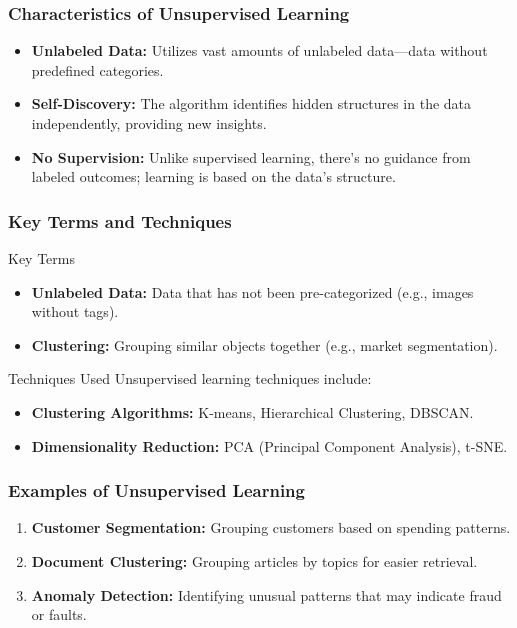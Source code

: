 \documentclass[aspectratio=169]{beamer}
\begin{document}
\begin{frame}[fragile]
    \frametitle{Characteristics of Unsupervised Learning}
    
    \begin{itemize}
        \item \textbf{Unlabeled Data:} 
        Utilizes vast amounts of unlabeled data—data without predefined categories.
        
        \item \textbf{Self-Discovery:} 
        The algorithm identifies hidden structures in the data independently, providing new insights.
        
        \item \textbf{No Supervision:} 
        Unlike supervised learning, there's no guidance from labeled outcomes; learning is based on the data's structure.
    \end{itemize}
\end{frame}

\begin{frame}[fragile]
    \frametitle{Key Terms and Techniques}
    
    \begin{block}{Key Terms}
        \begin{itemize}
            \item \textbf{Unlabeled Data:} Data that has not been pre-categorized (e.g., images without tags).
            \item \textbf{Clustering:} Grouping similar objects together (e.g., market segmentation).
        \end{itemize}
    \end{block}
    
    \begin{block}{Techniques Used}
        Unsupervised learning techniques include:
        \begin{itemize}
            \item \textbf{Clustering Algorithms:} K-means, Hierarchical Clustering, DBSCAN.
            \item \textbf{Dimensionality Reduction:} PCA (Principal Component Analysis), t-SNE.
        \end{itemize}
    \end{block}
\end{frame}

\begin{frame}[fragile]
    \frametitle{Examples of Unsupervised Learning}
    
    \begin{enumerate}
        \item \textbf{Customer Segmentation:} 
        Grouping customers based on spending patterns.
        
        \item \textbf{Document Clustering:} 
        Grouping articles by topics for easier retrieval.
        
        \item \textbf{Anomaly Detection:} 
        Identifying unusual patterns that may indicate fraud or faults.
    \end{enumerate}
\end{frame}
\end{document}
